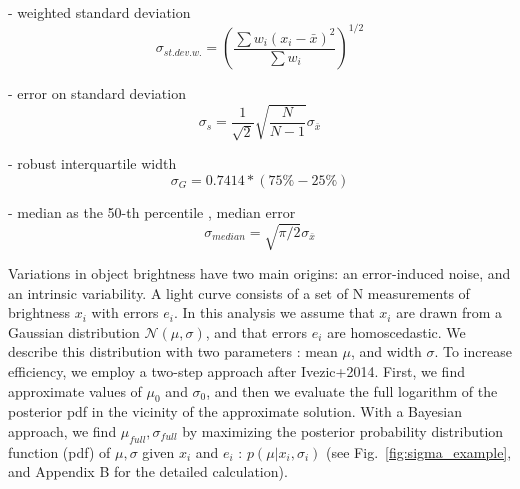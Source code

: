\documentclass[fleqn,usenatbib]{mnras}  %
\begin{document}
- weighted standard deviation 
\begin{equation}
\sigma_{st.dev.w.} = \left( \frac{\sum{w_{i}(x_{i} - \bar{x})^{2}}}{\sum{w_{i}}} \right) ^ {1/2}
\end{equation}

- error on standard deviation 
\begin{equation}
\sigma_{s} = \frac{1}{\sqrt{2}}\sqrt{\frac{N}{N-1}} \sigma_{\bar{x}}
\end{equation}

- robust interquartile width
\begin{equation}
\sigma_{G} = 0.7414 * (75\% - 25\%) 
\end{equation}

- median as the 50-th percentile , median error 
\begin{equation}
\sigma_{median} = \sqrt{\pi/2}\sigma_{\bar{x}}
\end{equation}
 

%
%

Variations in object brightness  have two main origins:  an  error-induced noise, and an intrinsic variability. A light curve consists of a set of N measurements of brightness  $x_{i}$  with  errors  $e_{i}$. In this analysis we assume that  $x_{i}$ are drawn from a Gaussian distribution  $\mathcal{N}(\mu,\sigma)$, and that errors $e_{i}$ are homoscedastic. We describe this distribution with two parameters : mean $\mu$, and width $\sigma$. To increase efficiency, we employ a two-step  approach after Ivezic+2014. 
First, we find approximate values of  $\mu_{0}$ and $\sigma_{0}$, and then we evaluate the full logarithm of the posterior pdf in the vicinity of the approximate solution.
With a Bayesian approach, we find $\mu_{full},\sigma_{full}$  by maximizing  the posterior probability distribution function (pdf) of  $\mu,\sigma$ given $x_{i}$ and $e_{i}$ : $p(\mu | {x_{i}},{\sigma_{i}})$ (see Fig.~\ref{fig:sigma_example}, and Appendix B for the detailed calculation). 
\end{document}
